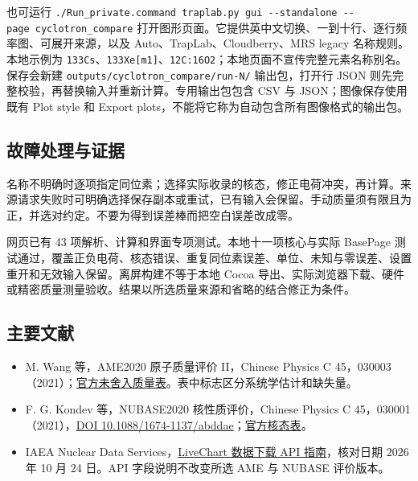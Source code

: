 \documentclass[
  aps,
  onecolumn,
  11pt]{revtex4-2}
\providecommand{\tightlist}{%
  \setlength{\itemsep}{0pt}\setlength{\parskip}{0pt}}
\begin{document}
也可运行
\texttt{./Run\_private.command\ traplab.py\ gui\ -\/-standalone\ -\/-page\ cyclotron\_compare}
打开图形页面。它提供英中文切换、一到十行、逐行频率图、可展开来源，以及
Auto、TrapLab、Cloudberry、MRS legacy 名称规则。本地示例为
\texttt{133Cs}、\texttt{133Xe{[}m1{]}}、\texttt{12C:16O2}；本地页面不宣传完整元素名称别名。保存会新建
\texttt{outputs/cyclotron\_compare/run-N/} 输出包，打开行 JSON
则先完整校验，再替换输入并重新计算。专用输出包包含 CSV 与
JSON；图像保存使用既有 Plot style 和 Export
plots，不能将它称为自动包含所有图像格式的输出包。

\subsection{故障处理与证据}\label{ux6545ux969cux5904ux7406ux4e0eux8bc1ux636e}

名称不明确时逐项指定同位素；选择实际收录的核态，修正电荷冲突，再计算。来源请求失败时可明确选择保存副本或重试，已有输入会保留。手动质量须有限且为正，并选对约定。不要为得到误差棒而把空白误差改成零。

网页已有 43 项解析、计算和界面专项测试。本地十一项核心与实际 BasePage
测试通过，覆盖正负电荷、核态错误、重复同位素误差、单位、未知与零误差、设置重开和无效输入保留。离屏构建不等于本地
Cocoa
导出、实际浏览器下载、硬件或精密质量测量验收。结果以所选质量来源和省略的结合修正为条件。

\subsection{主要文献}\label{ux4e3bux8981ux6587ux732e}

\begin{itemize}
\tightlist
\item
  M. Wang 等，AME2020 原子质量评价 II，Chinese Physics C
  45，030003（2021）；\href{https://www-nds.iaea.org/amdc/ame2020/mass_1.mas20.txt}{官方未舍入质量表}。表中标志区分系统学估计和缺失量。
\item
  F. G. Kondev 等，NUBASE2020 核性质评价，Chinese Physics C
  45，030001（2021），\href{https://doi.org/10.1088/1674-1137/abddae}{DOI
  10.1088/1674-1137/abddae}；\href{https://www-nds.iaea.org/amdc/ame2020/nubase_4.mas20.txt}{官方核态表}。
\item
  IAEA Nuclear Data
  Services，\href{https://www-nds.iaea.org/relnsd/vcharthtml/api_v0_guide.html}{LiveChart
  数据下载 API 指南}，核对日期 2026 年 10 月 24 日。API
  字段说明不改变所选 AME 与 NUBASE 评价版本。
\end{itemize}
\end{document}
